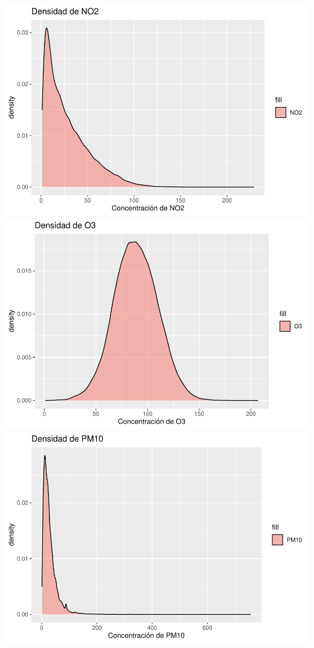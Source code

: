 \documentclass[notspecified,article,submit,moreauthors,pdftex]{Definitions/mdpi}
\begin{document}
\includegraphics{ProyectoAED2023_files/figure-latex/unnamed-chunk-21-1.pdf}
\includegraphics{ProyectoAED2023_files/figure-latex/unnamed-chunk-21-2.pdf}
\includegraphics{ProyectoAED2023_files/figure-latex/unnamed-chunk-21-3.pdf}
\end{document}
